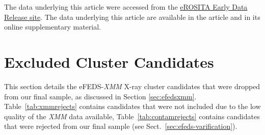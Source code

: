 \documentclass[fleqn,usenatbib]{mnras}
\begin{document}
The data underlying this article were accessed from the \href{https://erosita.mpe.mpg.de/edr/eROSITAObservations/Catalogues/}{eROSITA Early Data Release site}. The data underlying this article are available in the article and in its online supplementary material.









\appendix

\section{Excluded Cluster Candidates}
\label{app:rejected}

This section details the eFEDS-{\em XMM} X-ray cluster candidates that were dropped from our final sample, as discussed in Section \ref{sec:efedsxmm}. Table~\ref{tab:xmmrejects} contains candidates that were not included due to the low quality of the {\em XMM} data available, Table~\ref{tab:contamrejects} contains candidates that were rejected from our final sample (see Sect.~\ref{sec:efeds-varification}).
\end{document}
